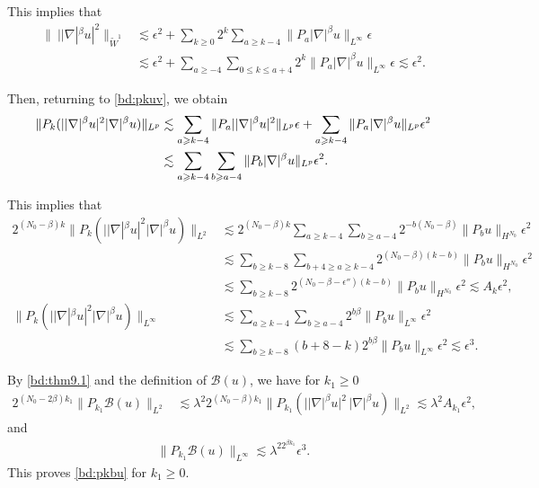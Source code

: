 \documentclass[UTF-8,reqno]{amsart}
\numberwithin{equation}{section}
\theoremstyle{definition}
\def\geq{\geqslant}
\def\leq{\leqslant}
\def\geq{\geqslant}
\def\leq{\leqslant}
\begin{document}
 This implies that
 \begin{align*}
    \|\ ||\nabla|^\beta u|^2\|_{\widetilde{W}^1}&\lesssim \epsilon^2+\sum_{k\geq0}2^k\sum_{a\geq k-4}\|P_a|\nabla|^\beta u\|_{L^\infty}\epsilon\\
    &\lesssim \epsilon^2+\sum_{a\geq-4}\sum_{0\leq k\leq a+4} 2^k \|P_a|\nabla|^\beta u\|_{L^\infty}\epsilon\lesssim \epsilon^2.
 \end{align*}

Then, returning to \eqref{bd:pkuv}, we obtain
\begin{align}
     \|P_k(||\nabla|^\beta u|^2|\nabla|^\beta u)\|_{L^p}
     &\lesssim \sum_{a\geq k-4}\|P_a||\nabla|^\beta u|^2\|_{L^p}\epsilon+\sum_{a\geq k-4}\|P_a|\nabla|^\beta u\|_{L^p}\epsilon^2 \notag\\
     &\lesssim \sum_{a\geq k-4}\sum_{b\geq a-4}\|P_b|\nabla|^\beta u\|_{L^p}\epsilon^2.\notag
 \end{align}
 
This implies that
\begin{align*}
    2^{(N_0-\beta)k}\|P_{k}(||\nabla|^\beta u|^2|\nabla|^\beta u)\|_{L^2}&\lesssim 2^{(N_0-\beta)k}\sum_{a\geq k-4}\sum_{b\geq a-4}2^{-b(N_0-\beta)}\|P_b  u\|_{H^{N_0}}\epsilon^2\\
    &\lesssim \sum_{b\geq k-8}\sum_{b+4\geq a\geq k-4}2^{(N_0-\beta)(k-b)}\|P_b  u\|_{H^{N_0}}\epsilon^2\\
    &\lesssim \sum_{b\geq k-8}2^{(N_0-\beta-\epsilon'')(k-b)}\|P_b  u\|_{H^{N_0}}\epsilon^2\lesssim A_k\epsilon^2,\\
     \|P_{k}(||\nabla|^\beta u|^2|\nabla|^\beta u)\|_{L^\infty}&\lesssim \sum_{a\geq k-4}\sum_{b\geq a-4}2^{b\beta}\|P_b  u\|_{L^\infty}\epsilon^2\\
    &\lesssim \sum_{b\geq k-8}(b+8-k)2^{b\beta}\|P_b  u\|_{L^\infty}\epsilon^2\lesssim \epsilon^3.
\end{align*}

By \eqref{bd:thm9.1} and the definition of $\mathscr{B}(u)$, we have for $k_1\geq0$
\begin{align*}
2^{(N_0-2\beta)k_1} \|P_{k_1}  \mathscr{B}(u)\|_{L^2}
&\lesssim 
\lambda^2 2^{(N_0-\beta)k_1}
\|P_{k_1}(\big||\nabla|^\beta u\big|^2\,|\nabla|^\beta u)\|_{L^2}\lesssim 
\lambda^2 A_{k_1}\epsilon^2,
\end{align*}
and
  \begin{align*}
   \|P_{k_1}  \mathscr{B}(u)\|_{L^\infty}\lesssim \lambda^22^{\beta k_1}  \epsilon^3.
 \end{align*}
This proves \eqref{bd:pkbu} for $k_1\geq 0$.
\end{document}

